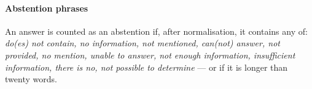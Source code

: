 \paragraph{Abstention phrases} An answer is counted as an abstention if,
after normalisation, it contains any of: \emph{do(es) not contain, no
information, not mentioned, can(not) answer, not provided, no mention,
unable to answer, not enough information, insufficient information, there
is no, not possible to determine} --- or if it is longer than twenty
words.
